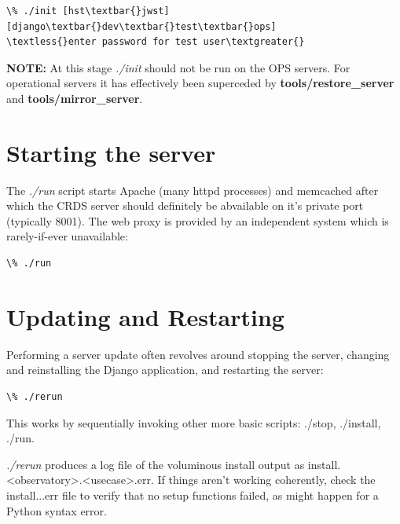 \documentclass[letterpaper,10pt,english]{sphinxmanual}
\begin{document}
\begin{Verbatim}[commandchars=\\\{\}]
\% ./init [hst\textbar{}jwst] [django\textbar{}dev\textbar{}test\textbar{}ops]
\textless{}enter password for test user\textgreater{}
\end{Verbatim}

\textbf{NOTE:}  At this stage \emph{./init} should not be run on the OPS servers.   For operational servers it
has effectively been superceded by \textbf{tools/restore\_server} and \textbf{tools/mirror\_server}.


\section{Starting the server}
\label{server_guide:starting-the-server}
The \emph{./run} script starts Apache (many httpd processes) and memcached after which the CRDS server should definitely
be abvailable on it's private port (typically 8001).   The web proxy is provided by an independent system which
is rarely-if-ever unavailable:

\begin{Verbatim}[commandchars=\\\{\}]
\% ./run
\end{Verbatim}


\section{Updating and Restarting}
\label{server_guide:updating-and-restarting}
Performing a server update often revolves around stopping the server,  changing and reinstalling the Django
application, and restarting the server:

\begin{Verbatim}[commandchars=\\\{\}]
\% ./rerun
\end{Verbatim}

This works by sequentially invoking other more basic scripts: ./stop, ./install, ./run.

\emph{./rerun} produces a log file of the voluminous install output as install.\textless{}observatory\textgreater{}.\textless{}usecase\textgreater{}.err.  If things
aren't working coherently,  check the install...err file to verify that no setup functions failed,  as might
happen for a Python syntax error.
\end{document}
